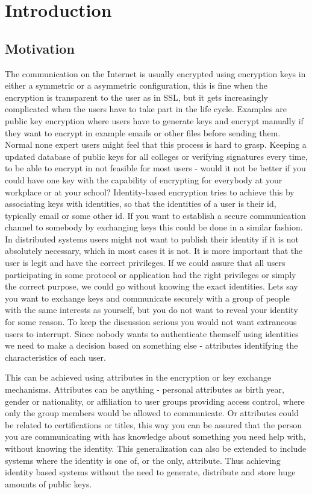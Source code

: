 \chapter{Introduction}
\label{chp:intro} 
\section{Motivation}
The communication on the Internet is usually encrypted using encryption keys in either a symmetric or a asymmetric configuration, this is fine when the encryption is transparent to the user as in SSL, but it gets increasingly complicated when the users have to take part in the life cycle. Examples are public key encryption where users have to generate keys and encrypt manually if they want to encrypt in example emails or other files before sending them. Normal none expert users might feel that this process is hard to grasp. Keeping a updated database of public keys for all colleges or verifying signatures every time, to be able to encrypt in not feasible for most users - would it not be better if you could have one key with the capability of encrypting for everybody at your workplace or at your school? Identity-based encryption tries to achieve this by associating keys with identities, so that the identities of a user is their id, typically email or some other id. If you want to establish a secure communication channel to somebody by exchanging keys this could be done in a similar fashion.
In distributed systems users might not want to publish their identity if it is not absolutely necessary, which in most cases it is not. It is more important that the user is legit and have the correct privileges. If we could assure that all users participating in some protocol or application had the right privileges or simply the correct purpose, we could go without knowing the exact identities. Lets say you want to exchange keys and communicate securely with a group of people with the same interests as yourself, but you do not want to reveal your identity for some reason. To keep the discussion serious you would not want extraneous users to interrupt. Since nobody wants to authenticate themself using identities we need to make a decision based on something else - attributes identifying the characteristics of each user. 
 \par This can be achieved using attributes in the encryption or key exchange mechanisms. Attributes can be anything - personal attributes as birth year, gender or nationality, or affiliation to user groups providing access control, where only the group members would be allowed to communicate. Or attributes could be related to certifications or titles, this way you can be assured that the person you are communicating with has knowledge about something you need help with, without knowing the identity. This generalization can also be extended to include systems where the identity is one of, or the only, attribute. Thus achieving identity based systems without the need to generate, distribute and store huge amounts of public keys. 
